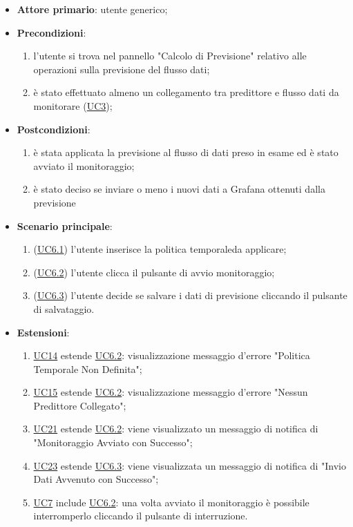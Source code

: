 		\begin{itemize}
			\item\textbf{Attore primario}: utente generico;
			\item\textbf{Precondizioni}:
				\begin{enumerate}
					\item l'utente si trova nel pannello "Calcolo di Previsione" relativo alle operazioni sulla previsione del flusso dati;
					\item è stato effettuato almeno un collegamento tra predittore e flusso dati da monitorare (\hyperref[par:UC3]{UC3});
				\end{enumerate}		
	\item\textbf{Postcondizioni}:
				\begin{enumerate}
					\item è stata applicata la previsione al flusso di dati preso in esame ed è stato avviato il monitoraggio;
					\item è stato deciso se inviare o meno i nuovi dati a Grafana ottenuti dalla previsione
				\end{enumerate}
			\item\textbf{Scenario principale}:
				\begin{enumerate}
					\item (\hyperref[par:UC6.1]{UC6.1}) l'utente inserisce la politica temporale\glo da applicare;
					\item (\hyperref[par:UC6.2]{UC6.2}) l'utente clicca il pulsante di avvio monitoraggio;
					\item (\hyperref[par:UC6.3]{UC6.3}) l'utente decide se salvare i dati di previsione cliccando il pulsante di salvataggio.
				\end{enumerate}
			\item\textbf{Estensioni}:
				\begin{enumerate}
					\item \hyperref[par:UC14]{UC14} estende \hyperref[par:UC6.2]{UC6.2}: visualizzazione messaggio d’errore "Politica Temporale Non Definita";
					\item \hyperref[par:UC15]{UC15} estende \hyperref[par:UC6.2]{UC6.2}: visualizzazione messaggio d’errore "Nessun Predittore Collegato";
					\item \hyperref[par:UC21]{UC21} estende \hyperref[par:UC6.2]{UC6.2}: viene visualizzato un messaggio di notifica di "Monitoraggio Avviato con Successo";
					\item \hyperref[par:UC23]{UC23} estende \hyperref[par:UC6.3]{UC6.3}: viene visualizzata un messaggio di notifica di "Invio Dati Avvenuto con Successo";
					\item \hyperref[par:UC7]{UC7} include \hyperref[par:UC6.2]{UC6.2}: una volta avviato il monitoraggio è possibile interromperlo cliccando il pulsante di interruzione.
				\end{enumerate}
		\end{itemize}

